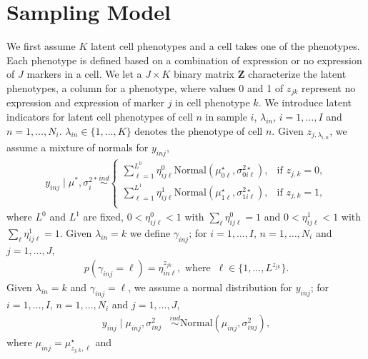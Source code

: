 \documentclass[12pt]{article}
\newcommand{\N}{ \mathcal{N} }
\newcommand{\ind}{\overset{ind}{\sim}}
\def\N{\text{Normal}}
\def\Z{\bm{Z}}
\begin{document}
\section{Sampling Model}\label{sampling-model}

We first assume $K$ latent cell phenotypes and a cell takes one of the
phenotypes. Each phenotype is defined based on a combination of expression or
no expression of $J$ markers in a cell. We let a $J \times K$ binary matrix
$\Z$ characterize the latent phenotypes, a column for a phenotype, where values
0 and 1 of $z_{jk}$ represent no expression and expression of marker $j$ in
cell phenotype $k$.  We introduce latent indicators for latent cell phenotypes
of cell $n$ in sample $i$, $\lambda_{in}$, $i=1, \ldots, I$ and $n=1, \ldots,
N_i$. $\lambda_{in} \in \{1, \ldots, K\}$ denotes the phenotype of cell $n$.
Given $z_{j, \lambda_{i,n}}$, we assume a mixture of normals for $y_{inj}$,
%
\begin{align*}
y_{inj} \mid \mu^*, \sigma^{2 *}_{i} \ind
\begin{cases}
\sum_{\ell=1}^{L^0} \eta^0_{ij\ell} \N(\mu^\star_{0\ell}, \sigma^{2 \star}_{0i\ell}), &\mbox{if $z_{j,k}=0$},\\
\sum_{\ell=1}^{L^1} \eta^1_{ij\ell} \N(\mu^\star_{1\ell}, \sigma^{2 \star}_{1i\ell}), &\mbox{if $z_{j,k}=1$},\\
\end{cases}
\end{align*}
%
where $L^0$ and $L^1$ are fixed, $0 < \eta^0_{ij\ell} < 1$ with
$\sum_{\ell} \eta^0_{ij\ell}=1$ and $0 < \eta^1_{ij\ell} < 1$ with
$\sum_{\ell} \eta^1_{ij\ell}=1$. Given $\lambda_{in}=k$ we define
$\gamma_{inj}$; for $i=1, \ldots, I$, $n=1, \ldots, N_i$ and
$j=1, \ldots, J$,
%
\begin{eqnarray*}
p(\gamma_{inj} = \ell)=\eta^{z_{jk}}_{in\ell}, \mbox{ where }~ \ell \in \{1,\ldots, L^{z_{jk}}\}.
\end{eqnarray*}
%
Given $\lambda_{in}=k$ and $\gamma_{inj}=\ell$, we assume a normal
distribution for $y_{inj}$; for $i=1, \ldots, I$,
$n=1, \ldots, N_i$ and $j=1, \ldots, J$,
%
\begin{align*}
  y_{inj} \mid \mu_{inj}, \sigma^2_{inj}  &\ind \N(\mu_{inj}, \sigma^2_{inj}),
\end{align*}
%
where $\mu_{inj} = \mu^\star_{z_{j,k},\ell}$ and
\end{document}
